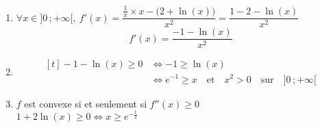 \documentclass{scrartcl}
\begin{document}
\begin{adjustwidth}{2em}{0pt}
\begin{enumerate}
            \item   $\forall x\in\big]0\,;+\infty\big[,\ f'(x)=\dfrac{\tfrac{1}{x}\times x-\big(2+\ln(x)\big)}{x^2}=\dfrac{1-2-\ln(x)}{x^2}$ \[\boxed{f'(x)=\frac{-1-\ln(x)}{x^2}}\]
                    \pagebreak
            \item   \[\begin{aligned}[t]
                        -1-\ln(x)\geq 0&\iff-1\geq\ln(x) \\
                        &\iff e^{-1}\geq x\quad\text{et}\quad x^2>0\quad\text{sur}\quad\big]0\,;+\infty\big[
                    \end{aligned}\]\vspace{1em}
                    \begin{center}\end{center}
                    \parbox{\linewidth}{}

            \item   $f$ est convexe si et seulement si $f''(x)\geq 0$ \\ $1+2\ln(x)\geq 0\iff x\geq e^{-\frac{1}{2}}$ \par \fbox{$f$ convexe sur $\big[e^{-\frac{1}{2}}\,;+\infty\big[$}
        \end{enumerate}
    \end{adjustwidth}
\end{document}
